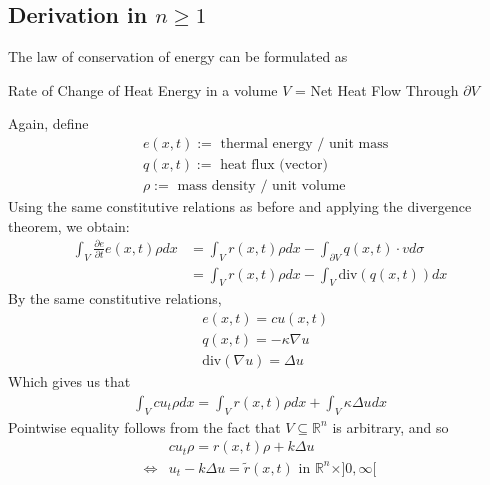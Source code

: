 \documentclass[11pt]{scrartcl}
\theoremstyle{definition}
\theoremstyle{remark}
\newcommand{\idx}[2]{\int_{#1}^{#2}}
\newcommand{\R}[0]{\mathbb{R}}
\begin{document}
\subsection{Derivation in $n \geq 1$}
The law of conservation of energy can be formulated as
\begin{center}
	Rate of Change of Heat Energy in a volume $V$ = Net Heat Flow Through $\partial V$
\end{center}
Again, define
\begin{align*}
	& e(x,t) := \text{ thermal energy / unit mass} \\
	& q(x,t) := \text{ heat flux (vector) } \\
	& \rho := \text{ mass density / unit volume} 
\end{align*}
Using the same constitutive relations as before and applying the divergence theorem, we obtain:
\begin{align*}
	\idx{V}{} \frac{\partial e}{\partial t} e(x,t) \rho dx & = \idx{V}{} r(x,t) \rho dx - \idx{\partial V}{} q(x,t) \cdot v d \sigma \\
	& = \idx{V}{} r(x,t) \rho dx - \idx{V}{} \text{div}(q(x,t)) dx 
\end{align*}
By the same constitutive relations, 
\begin{align*}
	& e(x,t) = cu(x,t) \\
	& q(x,t) = - \kappa \nabla u \\
	& \text{div}(\nabla u) = \Delta u
\end{align*}
Which gives us that
\begin{align*}
	\idx{V}{} c u_t \rho dx = \idx{V}{} r(x,t) \rho dx + \idx{V}{} \kappa \Delta u dx 
\end{align*}
Pointwise equality follows from the fact that $V \subseteq \R^n$ is arbitrary, and so
\begin{align*}
	& c u_t \rho = r(x,t)\rho + k \Delta u \\
	\iff & u_t - k \Delta u = \tilde{r}(x,t) \text{ in } \R^n \times ]0, \infty [
\end{align*}
\end{document}

